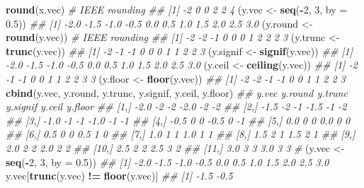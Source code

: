\documentclass[
]{book}
\newenvironment{Shaded}{\begin{snugshade}}{\end{snugshade}}
\newcommand{\CommentTok}[1]{\textcolor[rgb]{0.56,0.35,0.01}{\textit{#1}}}
\newcommand{\DataTypeTok}[1]{\textcolor[rgb]{0.13,0.29,0.53}{#1}}
\newcommand{\DecValTok}[1]{\textcolor[rgb]{0.00,0.00,0.81}{#1}}
\newcommand{\FloatTok}[1]{\textcolor[rgb]{0.00,0.00,0.81}{#1}}
\newcommand{\KeywordTok}[1]{\textcolor[rgb]{0.13,0.29,0.53}{\textbf{#1}}}
\newcommand{\NormalTok}[1]{#1}
\newcommand{\OperatorTok}[1]{\textcolor[rgb]{0.81,0.36,0.00}{\textbf{#1}}}
\newcommand{\StringTok}[1]{\textcolor[rgb]{0.31,0.60,0.02}{#1}}
\begin{document}
\begin{Shaded}
\begin{Highlighting}[]
\KeywordTok{round}\NormalTok{(x.vec) }\CommentTok{\# IEEE rounding}
\CommentTok{\#\# [1] {-}2  0  0  2  2  4}
\NormalTok{(y.vec \textless{}{-}}\StringTok{ }\KeywordTok{seq}\NormalTok{(}\OperatorTok{{-}}\DecValTok{2}\NormalTok{, }\DecValTok{3}\NormalTok{, }\DataTypeTok{by =} \FloatTok{0.5}\NormalTok{))}
\CommentTok{\#\#  [1] {-}2.0 {-}1.5 {-}1.0 {-}0.5  0.0  0.5  1.0  1.5  2.0  2.5  3.0}
\NormalTok{(y.round \textless{}{-}}\StringTok{ }\KeywordTok{round}\NormalTok{(y.vec)) }\CommentTok{\# IEEE rounding}
\CommentTok{\#\#  [1] {-}2 {-}2 {-}1  0  0  0  1  2  2  2  3}
\NormalTok{(y.trunc \textless{}{-}}\StringTok{ }\KeywordTok{trunc}\NormalTok{(y.vec))}
\CommentTok{\#\#  [1] {-}2 {-}1 {-}1  0  0  0  1  1  2  2  3}
\NormalTok{(y.signif \textless{}{-}}\StringTok{ }\KeywordTok{signif}\NormalTok{(y.vec))}
\CommentTok{\#\#  [1] {-}2.0 {-}1.5 {-}1.0 {-}0.5  0.0  0.5  1.0  1.5  2.0  2.5  3.0}
\NormalTok{(y.ceil \textless{}{-}}\StringTok{ }\KeywordTok{ceiling}\NormalTok{(y.vec))}
\CommentTok{\#\#  [1] {-}2 {-}1 {-}1  0  0  1  1  2  2  3  3}
\NormalTok{(y.floor \textless{}{-}}\StringTok{ }\KeywordTok{floor}\NormalTok{(y.vec))}
\CommentTok{\#\#  [1] {-}2 {-}2 {-}1 {-}1  0  0  1  1  2  2  3}
\KeywordTok{cbind}\NormalTok{(y.vec, y.round, y.trunc, y.signif, y.ceil, y.floor)}
\CommentTok{\#\#       y.vec y.round y.trunc y.signif y.ceil y.floor}
\CommentTok{\#\#  [1,]  {-}2.0      {-}2      {-}2     {-}2.0     {-}2      {-}2}
\CommentTok{\#\#  [2,]  {-}1.5      {-}2      {-}1     {-}1.5     {-}1      {-}2}
\CommentTok{\#\#  [3,]  {-}1.0      {-}1      {-}1     {-}1.0     {-}1      {-}1}
\CommentTok{\#\#  [4,]  {-}0.5       0       0     {-}0.5      0      {-}1}
\CommentTok{\#\#  [5,]   0.0       0       0      0.0      0       0}
\CommentTok{\#\#  [6,]   0.5       0       0      0.5      1       0}
\CommentTok{\#\#  [7,]   1.0       1       1      1.0      1       1}
\CommentTok{\#\#  [8,]   1.5       2       1      1.5      2       1}
\CommentTok{\#\#  [9,]   2.0       2       2      2.0      2       2}
\CommentTok{\#\# [10,]   2.5       2       2      2.5      3       2}
\CommentTok{\#\# [11,]   3.0       3       3      3.0      3       3}
\CommentTok{\#}
\NormalTok{(y.vec \textless{}{-}}\StringTok{ }\KeywordTok{seq}\NormalTok{(}\OperatorTok{{-}}\DecValTok{2}\NormalTok{, }\DecValTok{3}\NormalTok{, }\DataTypeTok{by =} \FloatTok{0.5}\NormalTok{))}
\CommentTok{\#\#  [1] {-}2.0 {-}1.5 {-}1.0 {-}0.5  0.0  0.5  1.0  1.5  2.0  2.5  3.0}
\NormalTok{y.vec[}\KeywordTok{trunc}\NormalTok{(y.vec) }\OperatorTok{!=}\StringTok{ }\KeywordTok{floor}\NormalTok{(y.vec)]}
\CommentTok{\#\# [1] {-}1.5 {-}0.5}

\end{Highlighting}
\end{Shaded}
\end{document}
